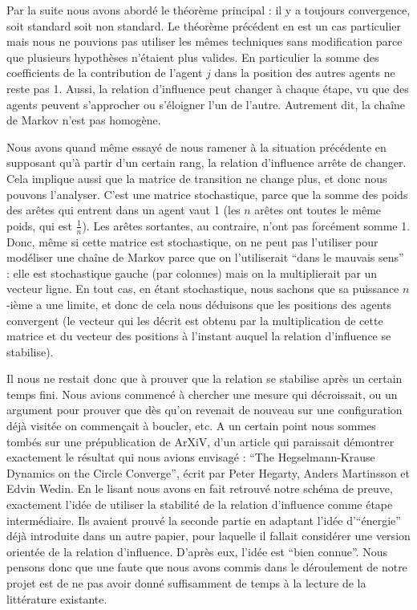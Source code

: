 \documentclass[a4paper,10pt]{article}
\begin{document}
Par la suite nous avons abordé le théorème principal : il y a toujours convergence, soit standard soit non standard. Le théorème précédent en est un cas particulier mais nous ne pouvions pas utiliser les mêmes techniques sans modification parce que plusieurs hypothèses n’étaient plus valides. En particulier la somme des coefficients de la contribution de l'agent $j$ dans la position des autres agents ne reste pas 1. Aussi, la relation d'influence peut changer à chaque étape, vu que des agents peuvent s'approcher ou s’éloigner l'un de l'autre. Autrement dit, la chaîne de Markov n'est pas homogène.

Nous avons quand même essayé de nous ramener à la situation précédente en supposant qu'à partir d'un certain rang, la relation d'influence arrête de changer. Cela implique aussi que la matrice de transition ne change plus, et donc nous pouvons l'analyser. C'est une matrice stochastique, parce que la somme des poids des arêtes qui entrent dans un agent vaut 1 (les $n$ arêtes ont toutes le même poids, qui est $\frac{1}{n}$). Les arêtes sortantes, au contraire, n'ont pas forcément somme 1. Donc, même si cette matrice est stochastique, on ne peut pas l'utiliser pour modéliser une chaîne de Markov parce que on l'utiliserait ``dans le mauvais sens'' : elle est stochastique gauche (par colonnes) mais on la multiplierait par un vecteur ligne. En tout cas, en étant stochastique, nous sachons que sa puissance $n$-ième a une limite, et donc de cela nous déduisons que les positions des agents convergent (le vecteur qui les décrit est obtenu par la multiplication de cette matrice et du vecteur des positions à l'instant auquel la relation d'influence se stabilise).

Il nous ne restait donc que à prouver que la relation se stabilise après un certain temps fini. Nous avions commencé à chercher une mesure qui décroissait, ou un argument pour prouver que dès qu'on revenait de nouveau sur une configuration déjà visitée on commençait à boucler, etc. A un certain point nous sommes tombés sur une prépublication de ArXiV, d'un article qui paraissait démontrer exactement le résultat qui nous avions envisagé : ``The Hegselmann-Krause Dynamics on the Circle Converge'', écrit par Peter Hegarty, Anders Martinsson et Edvin Wedin. En le lisant nous avons en fait retrouvé notre schéma de preuve, exactement l’idée de utiliser la stabilité de la relation d'influence comme étape intermédiaire. Ils avaient prouvé la seconde partie en adaptant l’idée d'``énergie'' déjà introduite dans un autre papier, pour laquelle il fallait considérer une version orientée de la relation d'influence. D'après eux, l'idée est ``bien connue''. Nous pensons donc que une faute que nous avons commis dans le déroulement de notre projet est de ne pas avoir donné suffisamment de temps à la lecture de la littérature existante.
\end{document}
